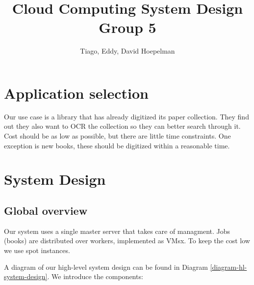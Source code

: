 \documentclass[10pt]{article}
\title{Cloud Computing System Design\\Group 5}
\author{Tiago, Eddy, David Hoepelman}
\begin{document}
\maketitle

\section{Application selection}

Our use case is a library that has already digitized its paper collection. They find out they also want to OCR the collection so they can better search through it. Cost should be as low as possible, but there are little time constraints. One exception is new books, these should be digitized within a reasonable time. 

\section{System Design}

\subsection*{Global overview}

Our system uses a single master server that takes care of managment. Jobs (books) are distributed over workers, implemented as VMsx. To keep the cost low we use spot instances.

A diagram of our high-level system design can be found in Diagram \ref{diagram-hl-system-design}. We introduce the components:

\end{document}
